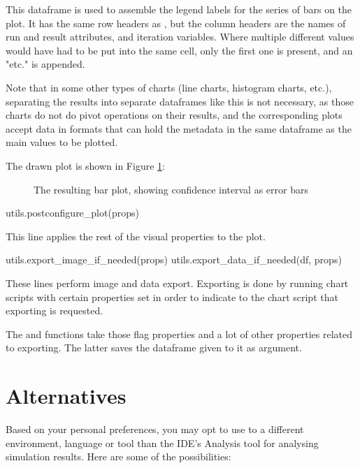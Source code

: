 This dataframe is used to assemble the legend labels for the series of bars on the plot.
It has the same row headers as , but the column headers are the names of run
and result attributes, and iteration variables. Where multiple different values would have
had to be put into the same cell, only the first one is present, and an "etc." is appended.

Note that in some other types of charts (line charts, histogram charts, etc.), separating
the results into separate dataframes like this is not necessary, as those charts do not do
pivot operations on their results, and the corresponding plots accept data in formats
that can hold the metadata in the same dataframe as the main values to be plotted.

The drawn plot is shown in Figure \ref{fig:ana-barplot}:

\begin{figure}[htbp]
  \begin{center}
    
    \caption{The resulting bar plot, showing confidence interval as error bars}
    \label{fig:ana-barplot}
  \end{center}
\end{figure}

\begin{python}
utils.postconfigure_plot(props)
\end{python}

This line applies the rest of the visual properties to the plot.

\begin{python}
utils.export_image_if_needed(props)
utils.export_data_if_needed(df, props)
\end{python}

These lines perform image and data export. Exporting is done by running chart scripts with
certain properties set in order to indicate to the chart script that exporting is requested.

The  and  functions
take those flag properties and a lot of other properties related to exporting.
The latter saves the dataframe given to it as argument.


\section{Alternatives}
\label{sec:ana-sim:result-analysis-alternatives}

Based on your personal preferences, you may opt to use to a different
environment, language or tool than the IDE's Analysis tool for analysing
simulation results. Here are some of the possibilities:

